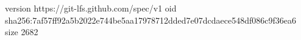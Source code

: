 version https://git-lfs.github.com/spec/v1
oid sha256:7af57ff92a5b2022e744be5aa17978712dded7e07dcdaece548df086c9f36ea6
size 2682
